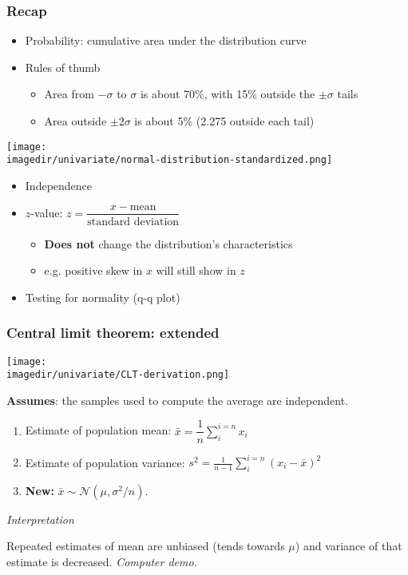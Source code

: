 \begin{frame}\frametitle{Recap}
	\begin{itemize}
		\item Probability: cumulative area under the distribution curve
		\item Rules of thumb
		\begin{itemize}
			\item Area from $-\sigma$ to $\sigma$ is about 70\%, with 15\% outside the $\pm \sigma$ tails
			\item Area outside $\pm 2\sigma$ is about 5\% (2.275 outside each tail)
		\end{itemize}
	\end{itemize}
	\begin{center}
		\texttt{[image: \\imagedir/univariate/normal-distribution-standardized.png]}
	\end{center}
	\begin{itemize}
		\item Independence
		\item $z$-value: $z = \dfrac{x - \text{mean}}{\text{standard deviation}}$
		\begin{itemize}
			\item \textbf{Does not} change the distribution's characteristics
			\item e.g. positive skew in $x$ will still show in $z$
		\end{itemize}
		\item Testing for normality (q-q plot)
	\end{itemize}
\end{frame}

\begin{frame}\frametitle{Central limit theorem: extended}

	\texttt{[image: \\imagedir/univariate/CLT-derivation.png]}

	\textbf{Assumes}: the samples used to compute the average are independent.
	\begin{enumerate}
		\item Estimate of population mean: $\bar{x} = \displaystyle \dfrac{1}{n} \sum_i^{i=n}{x_i}$
		\item Estimate of population variance: $s^2 =\displaystyle \frac{1}{n-1}\sum_i^{i=n}{(x_i - \bar{x})^2}$
		\item \textbf{New:} $\bar{x} \sim \mathcal{N}\left(\mu, \sigma^2/n \right)$.
	\end{enumerate}

	\emph{Interpretation}

	Repeated estimates of mean are unbiased (tends towards $\mu$) and variance of that estimate is decreased. \emph{Computer demo.}
\end{frame}

